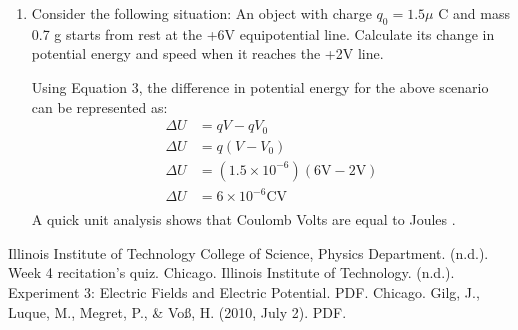 \documentclass [12pt, letterpaper, twoside] {article}
\begin{document}
\begin{enumerate}
  \item Consider the following situation: An object with charge \(q_{0} = 1.5\mu\) C and mass 0.7 g starts from rest at the +6V equipotential line. Calculate its change in potential energy and speed when it reaches the +2V line.

Using Equation 3, the difference in potential energy for the above scenario can be represented as:
\begin{equation*}
  \begin{split}
    \Delta{U} &= qV-qV_{0} \\
    \Delta{U} &= q(V-V_{0}) \\
    \Delta{U} &= (1.5\times{10^{-6}})(6\text{V}-2\text{V}) \\
    \Delta{U} &= 6\times{10^{-6}} \text{CV} \\
  \end{split}
\end{equation*}
A quick unit analysis shows that Coulomb Volts are equal to Joules \cite{quiz2}.

\end {enumerate}

  Illinois Institute of Technology College of Science, Physics Department. (n.d.). Week 4 recitation's quiz. Chicago.
  Illinois Institute of Technology. (n.d.). Experiment 3: Electric Fields and Electric Potential. PDF. Chicago.
  Gilg, J., Luque, M., Megret, P., \& Voß, H. (2010, July 2). PDF.
\end{document}
